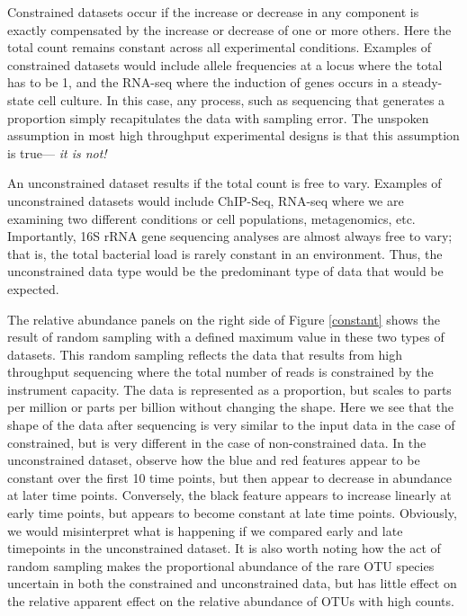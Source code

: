 \documentclass[twocolumn]{article}
\begin{document}
Constrained datasets occur if the increase or decrease in any component
is exactly compensated by the increase or decrease of one or more
others. Here the total count remains constant across all experimental
conditions. Examples of constrained datasets would include allele
frequencies at a locus where the total has to be 1, and the RNA-seq
where the induction of genes occurs in a steady-state cell culture. In
this case, any process, such as sequencing that generates a proportion
simply recapitulates the data with sampling error. The unspoken
assumption in most high throughput experimental designs is that this
assumption is true---\emph{ it is not!}

An unconstrained dataset results if the total count is free to vary.
Examples of unconstrained datasets would include ChIP-Seq, RNA-seq where
we are examining two different conditions or cell populations,
metagenomics, etc. Importantly, 16S rRNA gene sequencing analyses are
almost always free to vary; that is, the total bacterial load is rarely
constant in an environment. Thus, the unconstrained data type would be
the predominant type of data that would be expected.

The relative abundance panels on the right side of Figure \ref{constant}
shows the result of random sampling with a defined maximum value in
these two types of datasets. This random sampling reflects the data that
results from high throughput sequencing where the total number of reads
is constrained by the instrument capacity. The data is represented as a
proportion, but scales to parts per million or parts per billion without
changing the shape. Here we see that the shape of the data after
sequencing is very similar to the input data in the case of constrained,
but is very different in the case of non-constrained data. In the
unconstrained dataset, observe how the blue and red features appear to
be constant over the first 10 time points, but then appear to decrease
in abundance at later time points. Conversely, the black feature appears
to increase linearly at early time points, but appears to become
constant at late time points. Obviously, we would misinterpret what is
happening if we compared early and late timepoints in the unconstrained
dataset. It is also worth noting how the act of random sampling makes
the proportional abundance of the rare OTU species uncertain in both the
constrained and unconstrained data, but has little effect on the
relative apparent effect on the relative abundance of OTUs with high
counts.
\end{document}
